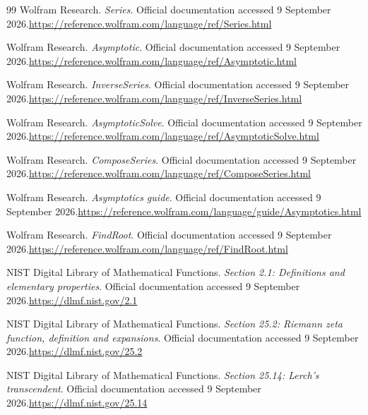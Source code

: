 \documentclass[11pt,a4paper]{article}
\begin{document}
\begin{thebibliography}{99}
 Wolfram Research. \emph{Series}. Official documentation accessed 9 September 2026.\newline\url{https://reference.wolfram.com/language/ref/Series.html}

 Wolfram Research. \emph{Asymptotic}. Official documentation accessed 9 September 2026.\newline\url{https://reference.wolfram.com/language/ref/Asymptotic.html}

 Wolfram Research. \emph{InverseSeries}. Official documentation accessed 9 September 2026.\newline\url{https://reference.wolfram.com/language/ref/InverseSeries.html}

 Wolfram Research. \emph{AsymptoticSolve}. Official documentation accessed 9 September 2026.\newline\url{https://reference.wolfram.com/language/ref/AsymptoticSolve.html}

 Wolfram Research. \emph{ComposeSeries}. Official documentation accessed 9 September 2026.\newline\url{https://reference.wolfram.com/language/ref/ComposeSeries.html}

 Wolfram Research. \emph{Asymptotics guide}. Official documentation accessed 9 September 2026.\newline\url{https://reference.wolfram.com/language/guide/Asymptotics.html}

 Wolfram Research. \emph{FindRoot}. Official documentation accessed 9 September 2026.\newline\url{https://reference.wolfram.com/language/ref/FindRoot.html}

 NIST Digital Library of Mathematical Functions. \emph{Section 2.1: Definitions and elementary properties}. Official documentation accessed 9 September 2026.\newline\url{https://dlmf.nist.gov/2.1}

 NIST Digital Library of Mathematical Functions. \emph{Section 25.2: Riemann zeta function, definition and expansions}. Official documentation accessed 9 September 2026.\newline\url{https://dlmf.nist.gov/25.2}

 NIST Digital Library of Mathematical Functions. \emph{Section 25.14: Lerch's transcendent}. Official documentation accessed 9 September 2026.\newline\url{https://dlmf.nist.gov/25.14}

\end{thebibliography}
\end{document}
